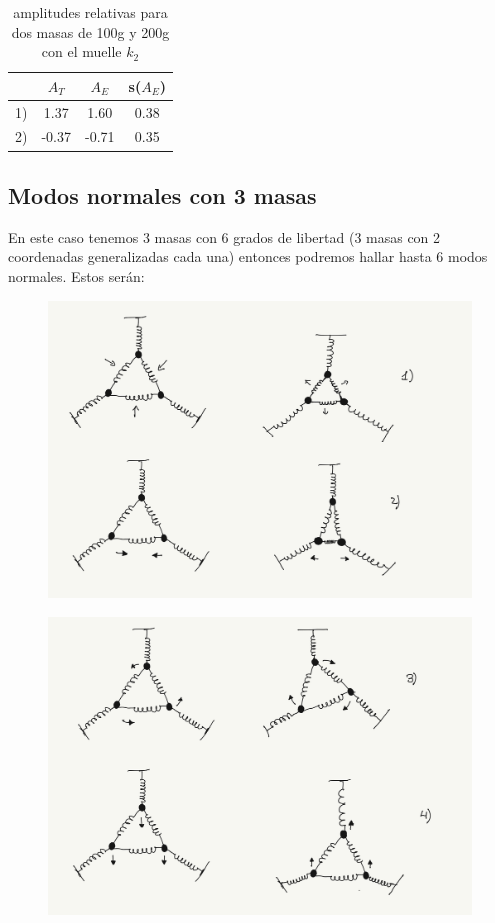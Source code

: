 \documentclass[12pt,a4paper]{article}
\begin{document}
\begin{table}[h!] \centering 
\begin{tabular}{|c|c|c|c|}  
\hline
 	 & $A_T$  	 & $A_E$ 	 & s($A_E$) \\ \hline 
1) 	 & 1.37   	 & 1.60   	 & 0.38 \\ 
 2) 	 & -0.37   	 & -0.71   	 & 0.35 \\ 
 \hline 
\end{tabular} 
\caption{amplitudes relativas para dos masas de 100g y 200g con el muelle $k_2$}
\label{} 
\end{table}

\newpage

\subsection{Modos normales con 3 masas}

En este caso tenemos 3 masas con 6 grados de libertad (3 masas con 2 coordenadas generalizadas cada una) entonces podremos hallar hasta 6 modos normales. Estos serán:



\begin{figure}[h!] \centering
\includegraphics[scale=0.3]{Modo-normal-2.png}
\label{fig:1}
\end{figure}

\begin{figure}[h!] \centering
\includegraphics[scale=0.3]{Modo-normal-3.png}
\label{fig:2}
\end{figure}
\end{document}
